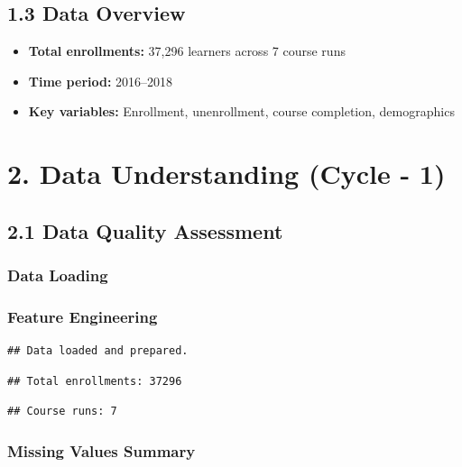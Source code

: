 \documentclass[
]{article}
\providecommand{\tightlist}{%
  \setlength{\itemsep}{0pt}\setlength{\parskip}{0pt}}
\begin{document}
\subsection{1.3 Data Overview}\label{data-overview}

\begin{itemize}
\tightlist
\item
  \textbf{Total enrollments:} 37,296 learners across 7 course runs\\
\item
  \textbf{Time period:} 2016--2018\\
\item
  \textbf{Key variables:} Enrollment, unenrollment, course completion,
  demographics
\end{itemize}

\section{2. Data Understanding (Cycle -
1)}\label{data-understanding-cycle---1}

\subsection{2.1 Data Quality Assessment}\label{data-quality-assessment}

\subsubsection{Data Loading}\label{data-loading}

\subsubsection{Feature Engineering}\label{feature-engineering}

\begin{verbatim}
## Data loaded and prepared.
\end{verbatim}

\begin{verbatim}
## Total enrollments: 37296
\end{verbatim}

\begin{verbatim}
## Course runs: 7
\end{verbatim}

\subsubsection{Missing Values Summary}\label{missing-values-summary}
\end{document}
